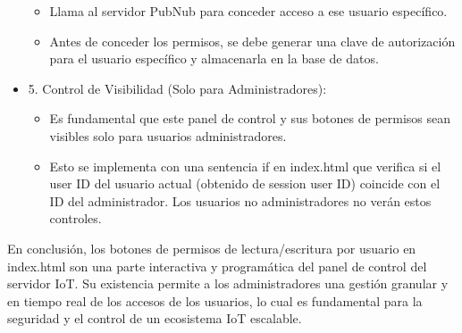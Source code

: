 \documentclass{report}
\begin{document}
\begin{itemize}
\begin{itemize}
            \item Llama al servidor PubNub para conceder acceso a ese usuario específico.
            \item Antes de conceder los permisos, se debe generar una clave de autorización para el usuario específico y almacenarla en la base de datos.
    \end{itemize}
    \item 5. Control de Visibilidad (Solo para Administradores):
    \begin{itemize}
        \item Es fundamental que este panel de control y sus botones de permisos sean visibles solo para usuarios administradores.
        \item Esto se implementa con una sentencia if en index.html que verifica si el user ID del usuario actual (obtenido de session user ID) 
        coincide con el ID del administrador. Los usuarios no administradores no verán estos controles.
    \end{itemize}
\end{itemize}
En conclusión, los botones de permisos de lectura/escritura por usuario en index.html son una parte interactiva y programática del panel de 
control del servidor IoT. Su existencia permite a los administradores una gestión granular y en tiempo real de los accesos de los usuarios, lo 
cual es fundamental para la seguridad y el control de un ecosistema IoT escalable.
\end{document}
